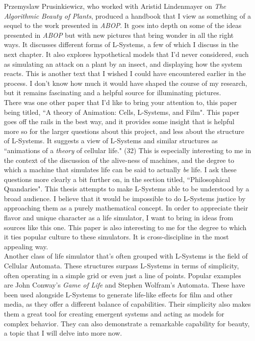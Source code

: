 \documentclass[12pt,twoside]{reedthesis}
\begin{document}
	Przemyslaw Prusinkiewicz, who worked with Aristid Lindenmayer on \textit{The Algorithmic Beauty of Plants}, produced a handbook that I view as something of a sequel to the work presented in \textit{ABOP}. It goes into depth on some of the ideas presented in \textit{ABOP} but with new pictures that bring wonder in all the right ways. It discusses different forms of L-Systems, a few of which I discuss in the next chapter. It also explores hypothetical models that I'd never considered, such as simulating an attack on a plant by an insect, and displaying how the system reacts. This is another text that I wished I could have encountered earlier in the process. I don't know how much it would have shaped the course of my research, but it remains fascinating and a helpful source for illuminating pictures.\\
	
	There was one other paper that I'd like to bring your attention to, this paper being titled, ``A theory of Animation: Cells, L-Systems, and Film". This paper goes off the rails in the best way, and it provides some insight that is helpful more so for the larger questions about this project, and less about the structure of L-Systems. It suggests a view of L-Systems and similar structures as ``animations of a \textit{theory} of cellular life." (32) This is especially interesting to me in the context of the discussion of the alive-ness of machines, and the degree to which a machine that simulates life can be said to actually \textit{be} life. I ask these questions more clearly a bit further on, in the section titled, ``Philosophical Quandaries". This thesis attempts to make L-Systems able to be understood by a broad audience. I believe that it would be impossible to do L-Systems justice by approaching them as a purely mathematical concept. In order to appreciate their flavor and unique character as a life simulator, I want to bring in ideas from sources like this one. This paper is also interesting to me for the degree to which it ties popular culture to these simulators. It is cross-discipline in the most appealing way.\\
	
	Another class of life simulator that's often grouped with L-Systems is the field of Cellular Automata. These structures surpass L-Systems in terms of simplicity, often operating in a simple grid or even just a line of points. Popular examples are John Conway's \textit{Game of Life} and Stephen Wolfram's Automata. These have been used alongside L-Systems to generate life-like effects for film and other media, as they offer a different balance of capabilities. Their simplicity also makes them a great tool for creating emergent systems and acting as models for complex behavior. They can also demonstrate a remarkable capability for beauty, a topic that I will delve into more now.\\
\end{document}
